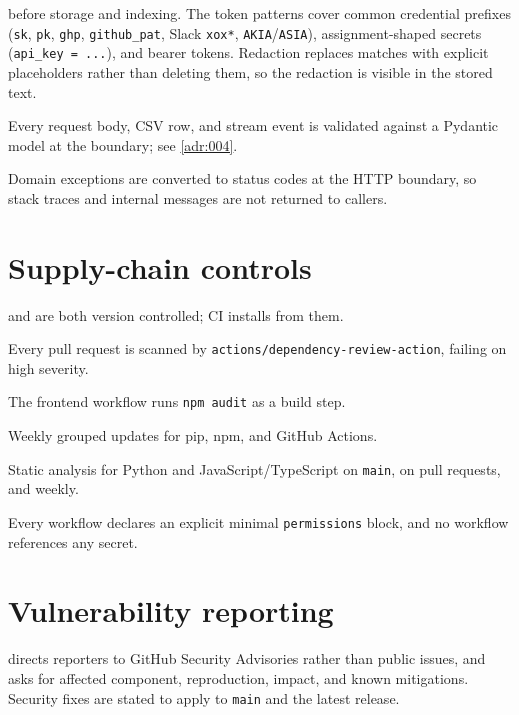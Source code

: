 \begin{description}
    before storage and indexing. The token patterns cover common credential
    prefixes (\texttt{sk}, \texttt{pk}, \texttt{ghp}, \texttt{github\_pat},
    Slack \texttt{xox*}, \texttt{AKIA}/\texttt{ASIA}), assignment-shaped
    secrets (\texttt{api\_key = ...}), and bearer tokens. Redaction replaces
    matches with explicit placeholders rather than deleting them, so the
    redaction is visible in the stored text.
  \item[Input validation] Every request body, CSV row, and stream event is
    validated against a Pydantic model at the boundary; see \cref{adr:004}.
  \item[Error mapping] Domain exceptions are converted to status codes at the
    HTTP boundary, so stack traces and internal messages are not returned to
    callers.
\end{description}

\section{Supply-chain controls}

\begin{description}[nosep]
  \item[Dependency locking]  and
     are both version controlled; CI
    installs from them.
  \item[Dependency review] Every pull request is scanned by
    \texttt{actions/dependency-review-action}, failing on high severity.
  \item[npm audit] The frontend workflow runs \texttt{npm audit} as a build
    step.
  \item[Dependabot] Weekly grouped updates for pip, npm, and GitHub Actions.
  \item[CodeQL] Static analysis for Python and JavaScript/TypeScript on
    \texttt{main}, on pull requests, and weekly.
  \item[Least-privilege workflows] Every workflow declares an explicit minimal
    \texttt{permissions} block, and no workflow references any secret.
\end{description}

\section{Vulnerability reporting}

 directs reporters to GitHub Security Advisories rather
than public issues, and asks for affected component, reproduction, impact, and
known mitigations. Security fixes are stated to apply to \texttt{main} and the
latest release.

